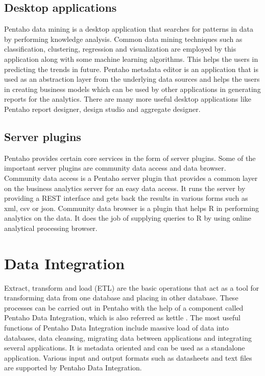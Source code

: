 \documentclass[9pt,twocolumn,twoside]{../../styles/osajnl}
\begin{document}
\subsection{Desktop applications}

Pentaho data mining is a desktop application that searches for
patterns in data by performing knowledge analysis. Common data mining
techniques such as classification, clustering, regression and
visualization are employed by this application along with some machine
learning algorithms. This helps the users in predicting the trends in
future. Pentaho metadata editor is an application that is used as an
abstraction layer from the underlying data sources and helps the users
in creating business models which can be used by other applications in
generating reports for the analytics. There are many more useful
desktop applications like Pentaho report designer, design studio and
aggregate designer.
 
\subsection{Server plugins}

Pentaho provides certain core services in the form of server
plugins. Some of the important server plugins are community data
access and data browser. Community data access is a Pentaho server
plugin that provides a common layer on the business analytics server
for an easy data access. It runs the server by providing a REST
interface and gets back the results in various forms such as xml, csv
or json. Community data browser is a plugin that helps R in performing
analytics on the data. It does the job of supplying queries to R by
using online analytical processing browser.

\section{Data Integration}

Extract, transform and load (ETL) are the basic operations that act as
a tool for transforming data from one database and placing in other
database. These processes can be carried out in Pentaho with the help
of a component called Pentaho Data Integration, which is also referred
as kettle \cite{pentaho-kettle}. The most useful functions of Pentaho
Data Integration include massive load of data into databases, data
cleansing, migrating data between applications and integrating several
applications. It is metadata oriented and can be used as a standalone
application. Various input and output formats such as datasheets and
text files are supported by Pentaho Data Integration.
\end{document}
